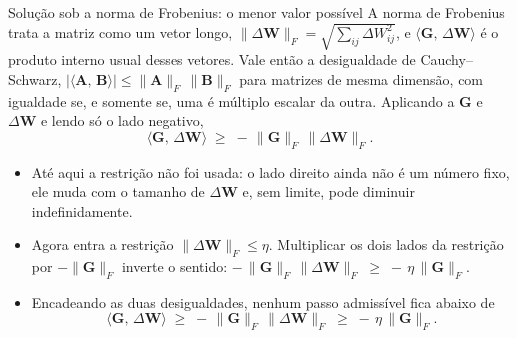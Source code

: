 \documentclass[aspectratio=169,xcolor=dvipsnames]{beamer}
\begin{document}
  \begin{frame}{Solução sob a norma de Frobenius: o menor valor possível}
    A norma de Frobenius trata a matriz como um vetor longo,
    $\|\Delta \mathbf{W}\|_{F}=\sqrt{\sum_{ij}\Delta W_{ij}^{2}}$, e $\langle \mathbf{G},\,\Delta \mathbf{W}\rangle$ é o
    produto interno usual desses vetores. Vale então a desigualdade de Cauchy--Schwarz,
    $|\langle \mathbf{A},\,\mathbf{B}\rangle|\le\|\mathbf{A}\|_{F}\,\|\mathbf{B}\|_{F}$ para matrizes de mesma
    dimensão, com igualdade se, e somente se, uma é múltiplo escalar da outra.
    Aplicando a $\mathbf{G}$ e $\Delta \mathbf{W}$ e lendo só o lado negativo,
    \[
      \langle \mathbf{G},\,\Delta \mathbf{W}\rangle \;\ge\; -\,\|\mathbf{G}\|_{F}\,\|\Delta \mathbf{W}\|_{F}.
    \]
    \begin{itemize}
      \item Até aqui a restrição não foi usada: o lado direito ainda não é um número fixo, ele
        muda com o tamanho de $\Delta \mathbf{W}$ e, sem limite, pode diminuir indefinidamente.
      \item Agora entra a restrição $\|\Delta \mathbf{W}\|_{F}\le\eta$. Multiplicar os dois lados da restrição por
        $-\|\mathbf{G}\|_{F}$ inverte o sentido:
        $-\,\|\mathbf{G}\|_{F}\,\|\Delta \mathbf{W}\|_{F}\;\ge\;-\,\eta\,\|\mathbf{G}\|_{F}$.
      \item Encadeando as duas desigualdades, nenhum passo admissível fica abaixo de
        \[
          \langle \mathbf{G},\,\Delta \mathbf{W}\rangle \;\ge\; -\,\|\mathbf{G}\|_{F}\,\|\Delta \mathbf{W}\|_{F} \;\ge\; -\,\eta\,\|\mathbf{G}\|_{F}.
        \]
    \end{itemize}
  \end{frame}
\end{document}
